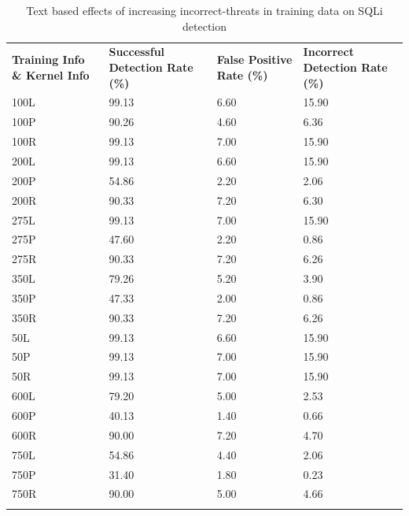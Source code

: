 \begin{appendices}
\begin{longtable}{|p{1.5in}|p{1in}|p{1in}|p{1in}|}
	\hline
	\textbf{Training Info \& Kernel Info} & \textbf{Successful Detection Rate (\%)} & \textbf{False Positive Rate (\%)} & \textbf{Incorrect Detection Rate (\%)}  \\
	\hhline{|=|=|=|=|}
 	100L & 99.13 & 6.60 & 15.90 \\ \hline
 	100P & 90.26 & 4.60 &  6.36 \\ \hline
 	100R & 99.13 & 7.00 & 15.90 \\ \hline
 	200L & 99.13 & 6.60 & 15.90 \\ \hline
 	200P & 54.86 & 2.20 &  2.06 \\ \hline
 	200R & 90.33 & 7.20 &  6.30 \\ \hline
 	275L & 99.13 & 7.00 & 15.90 \\ \hline
 	275P & 47.60 & 2.20 &  0.86 \\ \hline
 	275R & 90.33 & 7.20 &  6.26 \\ \hline
 	350L & 79.26 & 5.20 &  3.90 \\ \hline
 	350P & 47.33 & 2.00 &  0.86 \\ \hline
 	350R & 90.33 & 7.20 &  6.26 \\ \hline
  	50L & 99.13 & 6.60 & 15.90 \\ \hline
  	50P & 99.13 & 7.00 & 15.90 \\ \hline
  	50R & 99.13 & 7.00 & 15.90 \\ \hline
 	600L & 79.20 & 5.00 &  2.53 \\ \hline
 	600P & 40.13 & 1.40 &  0.66 \\ \hline
 	600R & 90.00 & 7.20 &  4.70 \\ \hline
 	750L & 54.86 & 4.40 &  2.06 \\ \hline
 	750P & 31.40 & 1.80 &  0.23 \\ \hline
 	750R & 90.00 & 5.00 &  4.66 \\ \hline
 	\caption{Text based effects of increasing incorrect-threats in training data on SQLi detection}
\end{longtable}
	

\end{appendices}
